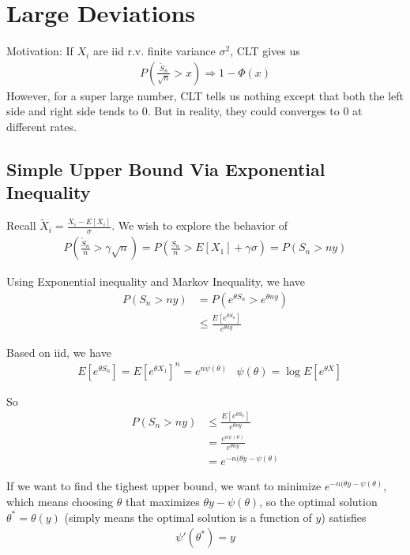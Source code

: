 \section{Large Deviations} 
Motivation: If $X_i$ are iid r.v. finite variance $\sigma^2$, CLT gives us 
    \begin{align*}
        P(\frac{\tilde{S}_n}{\sqrt{n}} > x) \Rightarrow 1 - \Phi(x)
    \end{align*}
However, for a super large number, CLT tells us nothing except that both the left side and right side tends to 0. But in reality, they could converges to 0 at different rates. 

\subsection{Simple Upper Bound Via Exponential Inequality} 
Recall $\tilde{X}_i = \frac{X_i - E[X_i]}{\sigma}$. We wish to explore the behavior of 
    \begin{align*}
        P(\frac{\tilde{S}_n}{n} > \gamma \sqrt{n}) = P(\frac{S_n}{n} > E[X_1] + \gamma \sigma) = P(S_n > ny)
    \end{align*}

Using Exponential inequality and Markov Inequality, we have 
    \begin{align*}
        P(S_n > ny)
        & = P(e^{\theta S_n} > e^{\theta ny})\\
        & \leq \frac{E[e^{\theta S_n}]}{e^{\theta n y}}
    \end{align*}

Based on iid, we have 
    \begin{align*}
        & E[e^{\theta S_n}] = E[e^{\theta X_1}]^n = e^{n \psi(\theta)}
        & \psi(\theta) = \log E[ e^{\theta X}] \tag{log moment generating function}
    \end{align*}

So 
    \begin{align*}
        P(S_n > ny) 
        & \leq  \frac{E[e^{\theta S_n}]}{e^{\theta n y}}\\
        & = \frac{e^{n \psi(\theta)}}{e^{\theta n y}}\\
        & = e^{-n(\theta y - \psi(\theta)}
    \end{align*}

If we want to find the tighest upper bound, we want to minimize $e^{-n(\theta y - \psi(\theta)}$, which means choosing $\theta$ that maximizes $\theta y - \psi(\theta)$, so the optimal solution $\theta^* = \theta(y)$ (simply means the optimal solution is a function of $y$) satisfies
    \begin{align*}
        \psi'(\theta^*) = y
    \end{align*}

